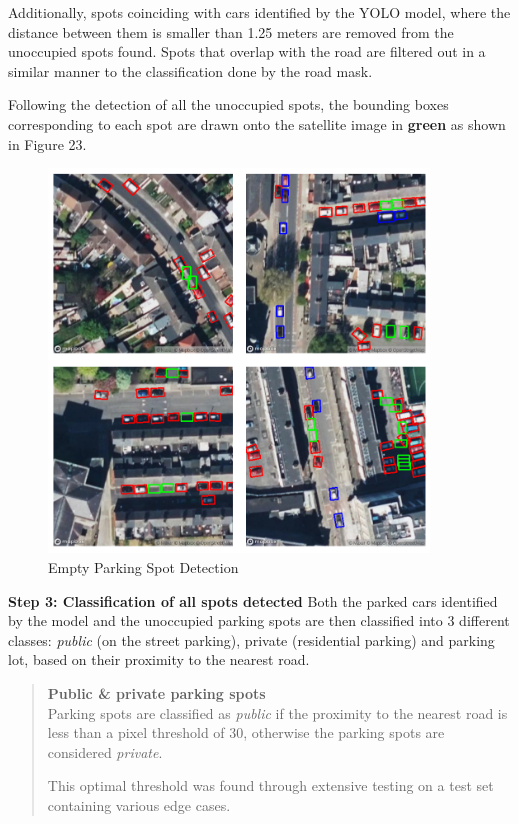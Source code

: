 Additionally, spots coinciding with cars identified by the YOLO model, where the
distance between them is smaller than 1.25 meters are removed from the unoccupied
spots found. Spots that overlap with the road are filtered out in a similar
manner to the classification done by the road mask.

Following the detection of all the unoccupied spots, the bounding boxes
corresponding to each spot are drawn onto the satellite image in \textbf{green} as shown
in Figure 23.

\begin{figure}[htbp]
  \centering
  \includegraphics[width=0.9\textwidth]{images/empty-parking-detection.png}
  \caption{Empty Parking Spot Detection}
  \label{fig:Empty_parking_detection}
\end{figure}

\newpage{}

\textbf{Step 3: Classification of all spots detected}
Both the parked cars identified by the model and the unoccupied parking spots are
then classified into 3 different classes: \emph{public} (on the street parking),
private (residential parking) and parking lot, based on their proximity to the
nearest road.

\vspace{0.5cm}

\begin{quote}
  \textbf{Public \& private parking spots} \\
  Parking spots are classified as \emph{public} if the proximity to the nearest
  road is less than a pixel threshold of 30, otherwise the parking spots are
  considered \emph{private}.

  This optimal threshold was found through extensive testing on a test set
  containing various edge cases.
\end{quote}

